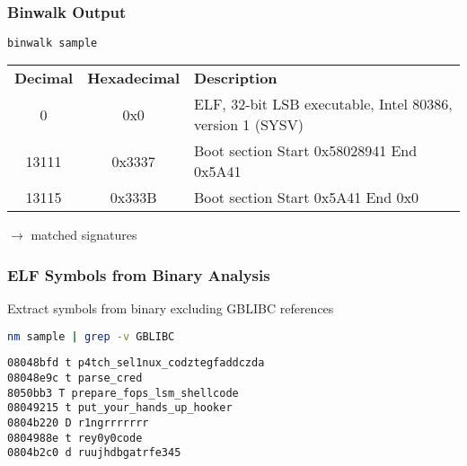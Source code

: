 \begin{frame}[fragile]
\frametitle{Binwalk Output}

\begin{lstlisting}[language=bash, basicstyle=\ttfamily, breaklines=true]
binwalk sample 
\end{lstlisting}

\begin{tabular}{ccp{}}
\textbf{Decimal} & \textbf{Hexadecimal} & \textbf{Description}\\
0                & 0x0                  & ELF, 32-bit LSB executable, Intel 80386, version 1 (SYSV) \\
13111            & 0x3337               & Boot section Start 0x58028941 End 0x5A41 \\
13115            & 0x333B               & Boot section Start 0x5A41 End 0x0 \\
\end{tabular}

\vspace{1cm}

$\to$ matched signatures
\end{frame}


\begin{frame}[fragile]
\frametitle{ELF Symbols from Binary Analysis}

Extract symbols from binary excluding GBLIBC references

\begin{lstlisting}[language=bash, basicstyle=\ttfamily, frame=single]
nm sample | grep -v GBLIBC
\end{lstlisting}


\begin{lstlisting}[basicstyle=\ttfamily, frame=single]
08048bfd t p4tch_sel1nux_codztegfaddczda
08048e9c t parse_cred
8050bb3 T prepare_fops_lsm_shellcode
08049215 t put_your_hands_up_hooker
0804b220 D r1ngrrrrrrr
0804988e t rey0y0code
0804b2c0 d ruujhdbgatrfe345
\end{lstlisting}
\end{frame}

